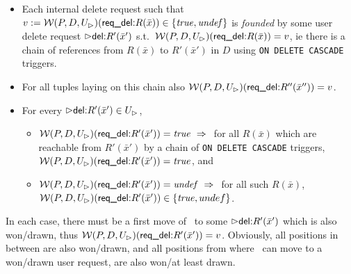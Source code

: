 \documentclass[twoside,11pt]{article}
\theoremstyle{lines}
\theoremstyle{longplain}
\def\rdel{\itorsf{req\_del:}}
\begin{document}
\begin{Theorem}\label{theo:founded}
\begin{itemize}
\item
  Each internal delete request such that
  $v := \pl W(P,D,U_\rhd)(\rdel R(\bar x)) \in \{\true, \undef\}$ is
  \emph{founded} by some user delete request $\extev \del R'(\bar x')$
  s.t.\ $\pl W(P,D,U_\rhd)(\rdel R(\bar x)) = v$, ie there is a chain of
  references from $R(\bar x)$ to $R'(\bar x')$ in $D$ using
  \texttt{ON DELETE CASCADE} triggers.
\item For all tuples laying on this chain also
  $\pl W(P,D,U_\rhd)(\rdel R''(\bar x'')) = v$.
\item For every $\extev \del R'(\bar x') \in U_\rhd$,
  \begin{itemize}
  \item $\pl W(P,D,U_\rhd)(\rdel R'(\bar x')) = \true \Imp$
    for all $R(\bar x)$ which are reachable from $R'(\bar x')$ by a
    chain of \texttt{ON DELETE CASCADE} triggers,
    $\pl W(P,D,U_\rhd)(\rdel R'(\bar x')) = \true$, and
  \item $\pl W(P,D,U_\rhd)(\rdel R'(\bar x')) = \undef \Imp$
    for all such $R(\bar x)$,
    $\pl W(P,D,U_\rhd)(\rdel R'(\bar x')) \in \{\true,undef\}$.
  \end{itemize}
\end{itemize}
\end{Theorem}
\begin{Definition}
In each case, there must be a first move of \I\ to some
$\extev \del R'(\bar x')$ which is also won/drawn, thus
$\pl W(P,D,U_\rhd)(\rdel R'(\bar x')) = v$. 
Obviously, all positions in between are also won/drawn, and
all positions from where \I\ can move to a won/drawn user request,
are also won/at least drawn.
\end{Definition}
\end{document}
